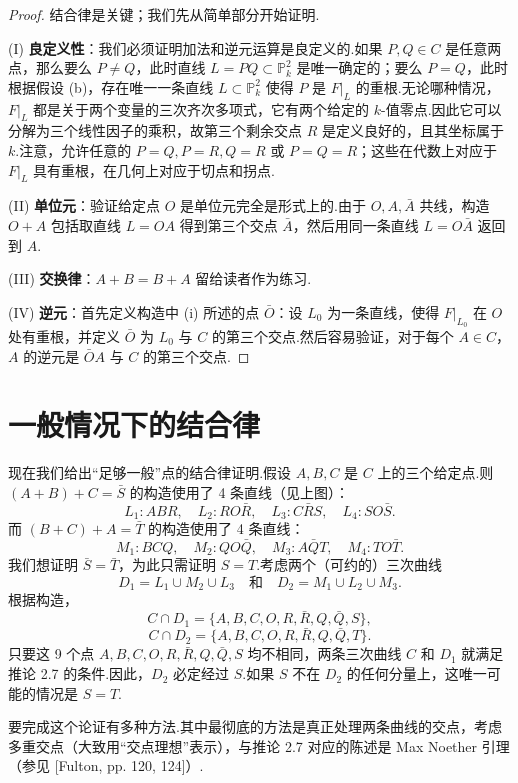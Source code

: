 \begin{proof}
结合律是关键；我们先从简单部分开始证明.

(I) \textbf{良定义性}：我们必须证明加法和逆元运算是良定义的.如果 \(P, Q \in C\) 是任意两点，那么要么 \(P \neq Q\)，此时直线 \(L = PQ \subset \mathbb{P}^2_k\) 是唯一确定的；要么 \(P = Q\)，此时根据假设 (b)，存在唯一一条直线 \(L \subset \mathbb{P}^2_k\) 使得 \(P\) 是 \(F|_L\) 的重根.无论哪种情况，\(F|_L\) 都是关于两个变量的三次齐次多项式，它有两个给定的 \(k\)-值零点.因此它可以分解为三个线性因子的乘积，故第三个剩余交点 \(R\) 是定义良好的，且其坐标属于 \(k\).注意，允许任意的 \(P=Q, P=R, Q=R\) 或 \(P=Q=R\)；这些在代数上对应于 \(F|_L\) 具有重根，在几何上对应于切点和拐点.

(II) \textbf{单位元}：验证给定点 \(O\) 是单位元完全是形式上的.由于 \(O, A, \bar{A}\) 共线，构造 \(O+A\) 包括取直线 \(L=OA\) 得到第三个交点 \(\bar{A}\)，然后用同一条直线 \(L=O\bar{A}\) 返回到 \(A\).

(III) \textbf{交换律}：\(A+B = B+A\) 留给读者作为练习.

(IV) \textbf{逆元}：首先定义构造中 (i) 所述的点 \(\bar{O}\)：设 \(L_0\) 为一条直线，使得 \(F|_{L_0}\) 在 \(O\) 处有重根，并定义 \(\bar{O}\) 为 \(L_0\) 与 \(C\) 的第三个交点.然后容易验证，对于每个 \(A \in C\)，\(A\) 的逆元是 \(\bar{O}A\) 与 \(C\) 的第三个交点.
\end{proof}

\section{一般情况下的结合律}

现在我们给出“足够一般”点的结合律证明.假设 \(A, B, C\) 是 \(C\) 上的三个给定点.则 \((A+B)+C = \bar{S}\) 的构造使用了 4 条直线（见上图）：
\[
L_1: ABR, \quad L_2: RO\bar{R}, \quad L_3: C\bar{R}S, \quad L_4: SO\bar{S}.
\]
而 \((B+C)+A = \bar{T}\) 的构造使用了 4 条直线：
\[
M_1: BCQ, \quad M_2: QO\bar{Q}, \quad M_3: A\bar{Q}T, \quad M_4: TO\bar{T}.
\]
我们想证明 \(\bar{S} = \bar{T}\)，为此只需证明 \(S=T\).考虑两个（可约的）三次曲线
\[
D_1 = L_1 \cup M_2 \cup L_3 \quad \text{和} \quad D_2 = M_1 \cup L_2 \cup M_3.
\]
根据构造，
\[
C \cap D_1 = \{A, B, C, O, R, \bar{R}, Q, \bar{Q}, S\},
\]
\[
C \cap D_2 = \{A, B, C, O, R, \bar{R}, Q, \bar{Q}, T\}.
\]
只要这 9 个点 \(A, B, C, O, R, \bar{R}, Q, \bar{Q}, S\) 均不相同，两条三次曲线 \(C\) 和 \(D_1\) 就满足推论 2.7 的条件.因此，\(D_2\) 必定经过 \(S\).如果 \(S\) 不在 \(D_2\) 的任何分量上，这唯一可能的情况是 \(S=T\).

要完成这个论证有多种方法.其中最彻底的方法是真正处理两条曲线的交点，考虑多重交点（大致用“交点理想”表示），与推论 2.7 对应的陈述是 Max Noether 引理（参见 [Fulton, pp. 120, 124]）.

